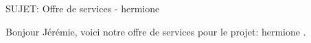 SUJET: Offre de services - hermione \par Bonjour Jérémie, voici notre offre de services pour le projet: hermione .